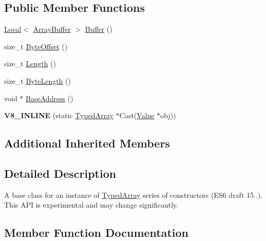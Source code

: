 \subsection*{Public Member Functions}
\begin{DoxyCompactItemize}
\item 
\hyperlink{classv8_1_1_local}{Local}$<$ \hyperlink{classv8_1_1_array_buffer}{Array\+Buffer} $>$ \hyperlink{classv8_1_1_typed_array_a0c083d9ccfe603ae6acec939f563555f}{Buffer} ()
\item 
size\+\_\+t \hyperlink{classv8_1_1_typed_array_a59ce175c77d96895d89cdc4209c74e45}{Byte\+Offset} ()
\item 
size\+\_\+t \hyperlink{classv8_1_1_typed_array_abb1047225d53d960c0da9c9f83cd7042}{Length} ()
\item 
size\+\_\+t \hyperlink{classv8_1_1_typed_array_aaeedecb2b2a80771d8fa733f8b8c86c9}{Byte\+Length} ()
\item 
void $\ast$ \hyperlink{classv8_1_1_typed_array_a66d641c27602c5fdbc2d0da2de61d32b}{Base\+Address} ()
\item 
\hypertarget{classv8_1_1_typed_array_a788c8a87a3561bc9c30c87a1024d3bd6}{}{\bfseries V8\+\_\+\+I\+N\+L\+I\+N\+E} (static \hyperlink{classv8_1_1_typed_array}{Typed\+Array} $\ast$Cast(\hyperlink{classv8_1_1_value}{Value} $\ast$obj))\label{classv8_1_1_typed_array_a788c8a87a3561bc9c30c87a1024d3bd6}

\end{DoxyCompactItemize}
\subsection*{Additional Inherited Members}


\subsection{Detailed Description}
A base class for an instance of \hyperlink{classv8_1_1_typed_array}{Typed\+Array} series of constructors (E\+S6 draft 15..). This A\+P\+I is experimental and may change significantly. 

\subsection{Member Function Documentation}
\hypertarget{classv8_1_1_typed_array_a66d641c27602c5fdbc2d0da2de61d32b}{}
